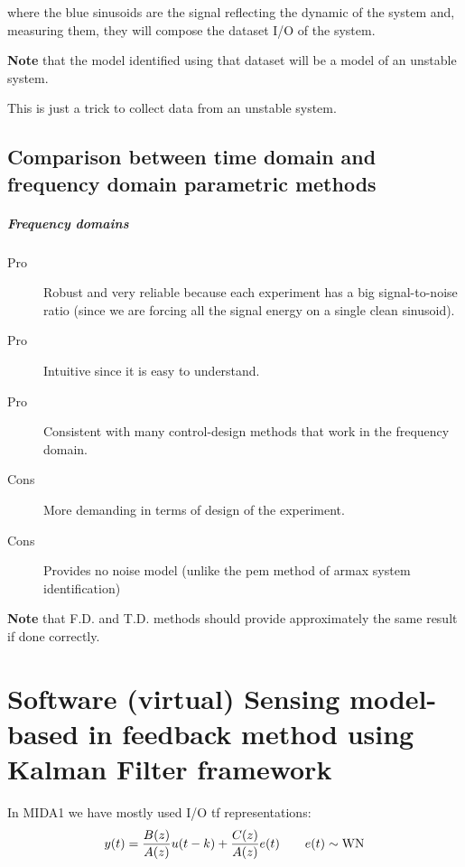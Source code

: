 \begin{remark}
\begin{figure}[H]
\begin{tikzpicture}[node distance=2.5cm,auto,>=latex']
        \end{tikzpicture}
    \end{figure}
    
    where the blue sinusoids are the signal reflecting the dynamic of the system and, measuring them, they will compose the dataset I/O of the system. 
    
    \textbf{Note} that the model identified using that dataset will be a model of an unstable system.
    
    This is just a trick to collect data from an unstable system.
\end{remark}



\section{Comparison between time domain and frequency domain parametric methods}

\paragraph{Frequency domains}
\begin{description}
    \item[Pro] Robust and very reliable because each experiment has a big signal-to-noise ratio (since we are forcing all the signal energy on a single clean sinusoid).
    \item[Pro] Intuitive since it is easy to understand.
    \item[Pro] Consistent with many control-design methods that work in the frequency domain.
    \item[Cons] More demanding in terms of design of the experiment.
    \item[Cons] Provides no noise model (unlike the \gls{pem} method of \gls{armax} system identification)
    \end{description}

\textbf{Note} that F.D. and T.D. methods should provide approximately the same result if done correctly.


\chapter{Software (virtual) Sensing model-based in feedback method using Kalman Filter framework}

In MIDA1 we have mostly used I/O \acrfull{tf} representations:
\[ y(t) = \frac{B(z)}{A(z)}u(t-k) + \frac{C(z)}{A(z)}e(t) \qquad e(t) \sim \WN \]


